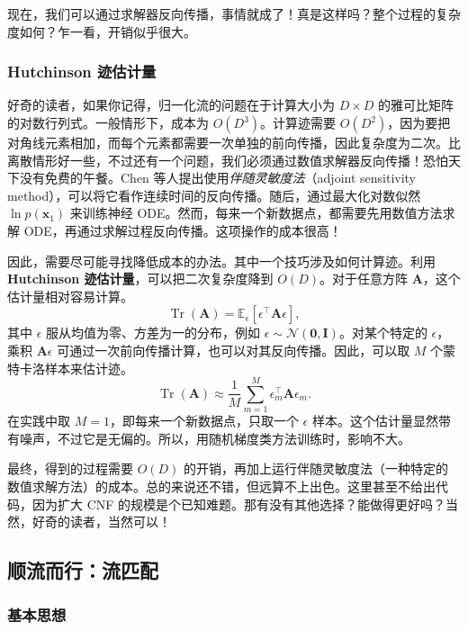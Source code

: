 现在，我们可以通过求解器反向传播，事情就成了！真是这样吗？整个过程的复杂度如何？乍一看，开销似乎很大。

\subsubsection{Hutchinson 迹估计量}

好奇的读者，如果你记得，归一化流的问题在于计算大小为 $D\times D$ 的雅可比矩阵的对数行列式。一般情形下，成本为 $O(D^3)$。计算迹需要 $O(D^2)$，因为要把对角线元素相加，而每个元素都需要一次单独的前向传播，因此复杂度为二次。比离散情形好一些，不过还有一个问题，我们必须通过数值求解器反向传播！恐怕天下没有免费的午餐。Chen 等人提出使用\emph{伴随灵敏度法}（adjoint sensitivity method），可以将它看作连续时间的反向传播。随后，通过最大化对数似然 $\ln p(\mathbf x_1)$ 来训练神经 ODE。然而，每来一个新数据点，都需要先用数值方法求解 ODE，再通过求解过程反向传播。这项操作的成本很高！

因此，需要尽可能寻找降低成本的办法。其中一个技巧涉及如何计算迹。利用\textbf{Hutchinson 迹估计量}，可以把二次复杂度降到 $O(D)$。对于任意方阵 $\mathbf A$，这个估计量相对容易计算。
\begin{equation}
  \operatorname{Tr}(\mathbf A)=\mathbb E_\epsilon[\epsilon^\top\mathbf A\epsilon],
  \tag{9.57}\label{eq:09-57}
\end{equation}
其中 $\epsilon$ 服从均值为零、方差为一的分布，例如 $\epsilon\sim\mathcal N(\mathbf 0,\mathbf I)$。对某个特定的 $\epsilon$，乘积 $\mathbf A\epsilon$ 可通过一次前向传播计算，也可以对其反向传播。因此，可以取 $M$ 个蒙特卡洛样本来估计迹。
\begin{equation}
  \operatorname{Tr}(\mathbf A)\approx\frac1M\sum_{m=1}^{M}\epsilon_m^\top\mathbf A\epsilon_m.
  \tag{9.58}\label{eq:09-58}
\end{equation}
在实践中取 $M=1$，即每来一个新数据点，只取一个 $\epsilon$ 样本。这个估计量显然带有噪声，不过它是无偏的。所以，用随机梯度类方法训练时，影响不大。

最终，得到的过程需要 $O(D)$ 的开销，再加上运行伴随灵敏度法（一种特定的数值求解方法）的成本。总的来说还不错，但远算不上出色。这里甚至不给出代码，因为扩大 CNF 的规模是个已知难题。那有没有其他选择？能做得更好吗？当然，好奇的读者，当然可以！

\subsection{顺流而行：流匹配}

\subsubsection{基本思想}


